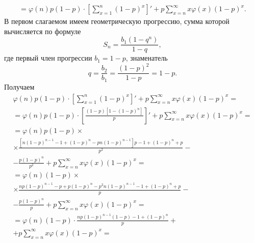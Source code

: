 \begin{enumerate}[label=\alph*)]
\begin{equation*}
\begin{split}
        = \varphi \left( n \right) p \left( 1 - p \right) \cdot
        \left[ \sum \limits_{x = 1}^n \left( 1 - p \right)^x \right]' +
        p \sum \limits_{x = n}^{ \infty } x \varphi \left( x \right) \left( 1 - p \right)^x.
      \end{split}
    \end{equation*}
    В первом слагаемом имеем геометрическую прогрессию, сумма которой вычисляется по формуле
    $$S_n =
      \frac{b_1 \left( 1 - q^n \right) }{1 - q},$$
    где первый член прогрессии $b_1 = 1 - p$, знаменатель
    $$q =
      \frac{b_2}{b_1} =
      \frac{ \left( 1 - p \right)^2}{1 - p} =
      1 - p.$$
    Получаем
    \begin{equation*}
      \begin{split}
        \varphi \left( n \right) p \left( 1 - p \right) \cdot
        \left[ \sum \limits_{x = 1}^n  \left( 1 - p \right)^x \right]' +
        p \sum \limits_{x = n}^{ \infty } x \varphi \left( x \right)  \left( 1 - p \right)^x = \\
        = \varphi \left( n \right) p \left( 1 - p \right) \cdot
        \left[ \frac{ \left( 1 - p \right) \left[ 1 - \left( 1 - p \right)^n \right] }{p} \right]' +
        p \sum \limits_{x = n}^{ \infty } x \varphi \left( x \right) \left( 1 - p \right)^x = \\
        = \varphi \left( n \right) p \left( 1 - p \right) \times \\
        \times \frac{ \left[ n \left( 1 - p \right)^{n - 1} - 1 + \left( 1 - p \right)^n - pn \left( 1 - p \right)^{n - 1} \right] p - 1 + \left( 1 - p \right)^n + p}{p^2} - \\
        - \frac{p \left( 1 - p \right)^n}{p^2} +
        p \sum \limits_{x = n}^{ \infty } x \varphi \left( x \right) \left( 1 - p \right)^x = \\
        = \varphi \left( n \right) \left( 1 - p \right) \times \\
        \times \frac{np \left( 1 - p \right)^{n - 1} - p + p \left( 1 - p \right)^n - p^2 n \left( 1 - p \right)^{n - 1} - 1 + \left( 1 - p \right)^n + p}{p} - \\
        - \frac{p \left( 1 - p \right)^n}{p} +
        p \sum \limits_{x = n}^{ \infty } x \varphi \left( x \right) \left( 1 - p \right)^x = \\
        = \varphi \left( n \right) \left( 1 - p \right) \cdot
        \frac{np \left( 1 - p \right)^{n - 1} \left( 1 - p \right) - 1 + \left( 1 - p \right)^n}{p} + \\
        + p \sum \limits_{x = n}^{ \infty } x \varphi \left( x \right) \left( 1 - p \right)^x = \\

\end{split}
\end{equation*}
\end{enumerate}
